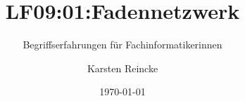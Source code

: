 \documentclass[]{beamer}
\title{LF09:01:Fadennetzwerk}
\subtitle{Begriffserfahrungen für Fachinformatikerinnen}
\institute{GS-LDK}
\author{Karsten Reincke}
\date{\today}
\def\cfgGl{../../../cfg.gl/}
\begin{document}

\begin{frame}
  \titlepage
\end{frame}






\logo{}
\newpage



%
\end{document}
